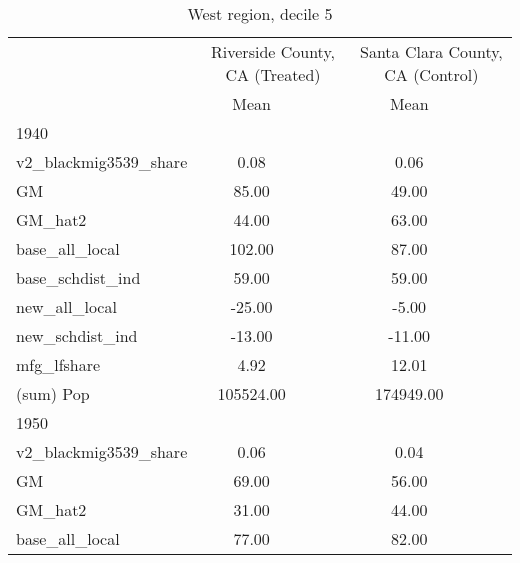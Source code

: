 \begin{table}[htbp]\centering
\def\sym#1{\ifmmode^{#1}\else\(^{#1}\)\fi}
\caption{West region, decile 5 \label{tab1}}
\begin{tabular}{l*{2}{ccc}}
\toprule
                    &\multicolumn{3}{c}{Riverside County, CA (Treated)}&\multicolumn{3}{c}{Santa Clara County, CA (Control)}\\
                    &        Mean&            &            &        Mean&            &            \\
\midrule
1940                &            &            &            &            &            &            \\
v2\_blackmig3539\_share&        0.08&            &            &        0.06&            &            \\
GM                  &       85.00&            &            &       49.00&            &            \\
GM\_hat2             &       44.00&            &            &       63.00&            &            \\
base\_all\_local      &      102.00&            &            &       87.00&            &            \\
base\_schdist\_ind    &       59.00&            &            &       59.00&            &            \\
new\_all\_local       &      -25.00&            &            &       -5.00&            &            \\
new\_schdist\_ind     &      -13.00&            &            &      -11.00&            &            \\
mfg\_lfshare         &        4.92&            &            &       12.01&            &            \\
(sum) Pop           &   105524.00&            &            &   174949.00&            &            \\
\midrule
1950                &            &            &            &            &            &            \\
v2\_blackmig3539\_share&        0.06&            &            &        0.04&            &            \\
GM                  &       69.00&            &            &       56.00&            &            \\
GM\_hat2             &       31.00&            &            &       44.00&            &            \\
base\_all\_local      &       77.00&            &            &       82.00&            &            \\

\end{tabular}
\end{table}
